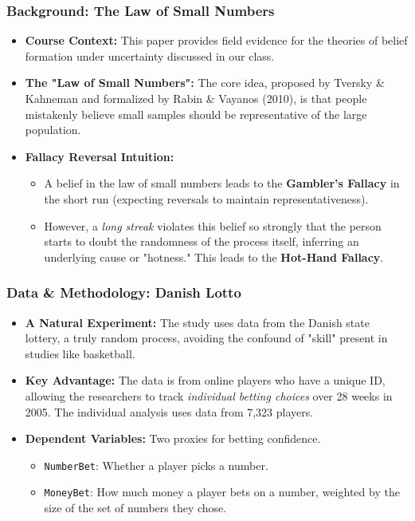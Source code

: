 \documentclass{beamer}
\begin{document}
\begin{frame}
    \frametitle{Background: The Law of Small Numbers}
    \begin{itemize}
        \item \textbf{Course Context:} This paper provides field evidence for the theories of belief formation under uncertainty discussed in our class.
        \vspace{1em}
        \item \textbf{The "Law of Small Numbers":} The core idea, proposed by Tversky \& Kahneman and formalized by Rabin \& Vayanos (2010), is that people mistakenly believe small samples should be representative of the large population.
        \vspace{1em}
        \item \textbf{Fallacy Reversal Intuition:}
        \begin{itemize}
            \item A belief in the law of small numbers leads to the \textbf{Gambler's Fallacy} in the short run (expecting reversals to maintain representativeness).
            \item However, a \textit{long streak} violates this belief so strongly that the person starts to doubt the randomness of the process itself, inferring an underlying cause or "hotness." This leads to the \textbf{Hot-Hand Fallacy}.
        \end{itemize}
    \end{itemize}
\end{frame}

\begin{frame}
    \frametitle{Data \& Methodology: Danish Lotto}
    \begin{itemize}
        \item \textbf{A Natural Experiment:} The study uses data from the Danish state lottery, a truly random process, avoiding the confound of "skill" present in studies like basketball.
        \vspace{1em}
        \item \textbf{Key Advantage:} The data is from online players who have a unique ID, allowing the researchers to track \textit{individual betting choices} over 28 weeks in 2005. The individual analysis uses data from 7,323 players.
        \vspace{1em}
        \item \textbf{Dependent Variables:} Two proxies for betting confidence.
        \begin{itemize}
            \item \texttt{NumberBet}: Whether a player picks a number.
            \item \texttt{MoneyBet}: How much money a player bets on a number, weighted by the size of the set of numbers they chose.
        \end{itemize}
    \end{itemize}
\end{frame}
\end{document}
